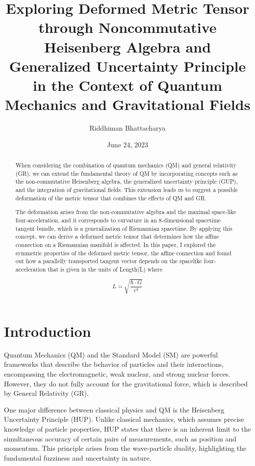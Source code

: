 \documentclass{article}
\title{\textbf{Exploring Deformed Metric Tensor through Noncommutative Heisenberg Algebra and 
Generalized Uncertainty Principle in the Context of Quantum Mechanics and Gravitational Fields}}
\author{\Large Riddhiman Bhattacharya}
\date{June 24, 2023}
\begin{document}
\maketitle
\large 
\begin{abstract}
\Large


When considering the combination of quantum mechanics (QM) and general relativity (GR), 
we can extend the fundamental theory of QM by incorporating concepts such as the non-commutative
Heisenberg algebra, the generalized uncertainty principle (GUP), and the integration of gravitational fields. This extension leads us to suggest a possible deformation of the metric tensor that combines the effects of QM and GR.

The deformation arises from the non-commutative algebra and the maximal space-like 
four-acceleration, and it corresponds to curvature in an 8-dimensional spacetime tangent bundle, which is a generalization of Riemannian spacetime. By applying this concept, we can derive a deformed metric tensor that determines how the affine connection on a Riemannian manifold is affected.
In this paper, I explored the symmetric properties of the deformed metric tensor, the affine connection and found out how a parallelly transported tangent vector depends on the spacelike four-acceleration that is given in the units of Length(L)
where 


\begin{equation}
L = \sqrt{\frac{\hbar \cdot G}{c^3}}
\label{eq:1}
\end{equation}

\end{abstract}

\section{\huge Introduction}
\Large 

Quantum Mechanics (QM) and the Standard Model (SM) are powerful frameworks that describe the behavior of particles and their interactions, encompassing the electromagnetic, weak nuclear, and strong nuclear forces. However, they do not fully account for the gravitational force, which is described by General Relativity (GR).

One major difference between classical physics and QM is the Heisenberg Uncertainty Principle (HUP). Unlike classical mechanics, which assumes precise knowledge of particle properties, HUP states that there is an inherent limit to the simultaneous accuracy of certain pairs of measurements, such as position and momentum. This principle arises from the wave-particle duality, highlighting the fundamental fuzziness and uncertainty in nature.
\end{document}
